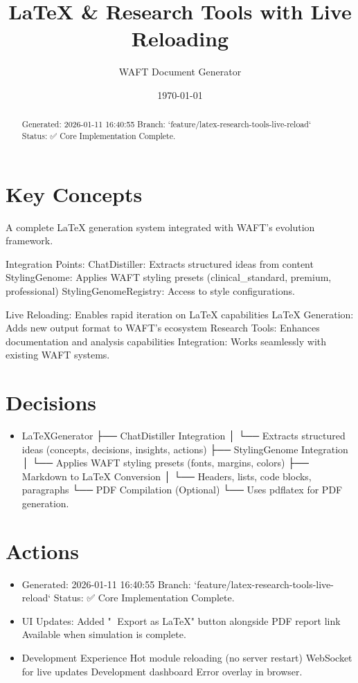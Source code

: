 \documentclass[11pt,letterpaper]{article}
\title{LaTeX \& Research Tools with Live Reloading}
\author{WAFT Document Generator}
\date{\today}
\begin{document}
\maketitle

\begin{abstract}
Generated: 2026-01-11 16:40:55 Branch: `feature/latex-research-tools-live-reload` Status: ✅ Core Implementation Complete.
\end{abstract}

\section{Key Concepts}
A complete LaTeX generation system integrated with WAFT's evolution framework.

Integration Points: ChatDistiller: Extracts structured ideas from content StylingGenome: Applies WAFT styling presets (clinical\_standard, premium, professional) StylingGenomeRegistry: Access to style configurations.

Live Reloading: Enables rapid iteration on LaTeX capabilities LaTeX Generation: Adds new output format to WAFT's ecosystem Research Tools: Enhances documentation and analysis capabilities Integration: Works seamlessly with existing WAFT systems.

\section{Decisions}
\begin{itemize}
\item LaTeXGenerator ├── ChatDistiller Integration │ └── Extracts structured ideas (concepts, decisions, insights, actions) ├── StylingGenome Integration │ └── Applies WAFT styling presets (fonts, margins, colors) ├── Markdown to LaTeX Conversion │ └── Headers, lists, code blocks, paragraphs └── PDF Compilation (Optional) └── Uses pdflatex for PDF generation.
\end{itemize}

\section{Actions}
\begin{itemize}
\item Generated: 2026-01-11 16:40:55 Branch: `feature/latex-research-tools-live-reload` Status: ✅ Core Implementation Complete.
\item UI Updates: Added "📝 Export as LaTeX" button alongside PDF report link Available when simulation is complete.
\item Development Experience Hot module reloading (no server restart) WebSocket for live updates Development dashboard Error overlay in browser.
\end{itemize}
\end{document}
